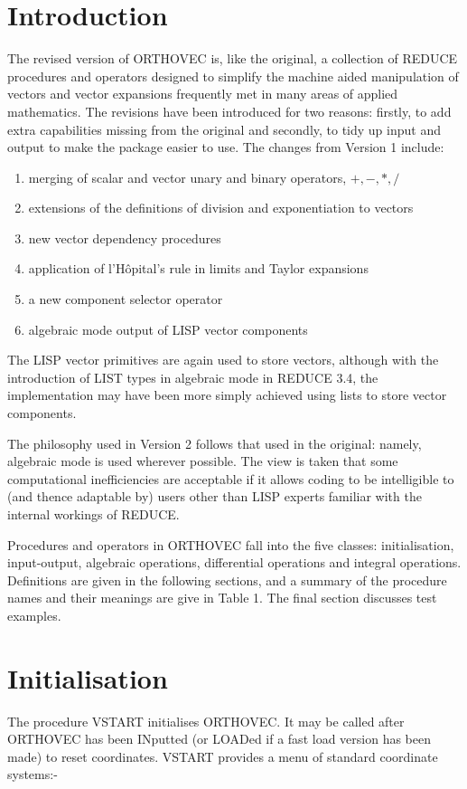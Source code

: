 \section{Introduction}
The revised version of ORTHOVEC\cite{Eastwood:91} is, like the
original\cite{Eastwood:87}, a collection of REDUCE procedures and
operators designed to simplify the machine aided manipulation of vectors
and vector expansions frequently met in many areas of applied mathematics.
The revisions have been introduced for two reasons: firstly, to add extra
capabilities missing from the original and secondly, to tidy up input and
output to make the package easier to use.
\newpage
The changes from Version 1 include:

\begin{enumerate}
\item merging of scalar and vector unary and binary operators, $+, - , *, /
$
\item extensions of the definitions of division and exponentiation 
to vectors
\item new vector dependency procedures
\item application of l'H\^opital's rule in limits and Taylor expansions
\item a new component selector operator
\item algebraic mode output of LISP vector components
\end{enumerate}

The LISP vector primitives are again used to store vectors, although 
with the introduction of LIST types in algebraic mode in REDUCE
3.4, the implementation may have been more simply achieved 
using lists to store vector components.

The philosophy used in Version 2 follows that used in the original:
namely, algebraic mode is used wherever possible.  The view is taken
that some computational inefficiencies are acceptable if it allows
coding to be intelligible to (and thence adaptable by) users other
than LISP experts familiar with the internal workings of REDUCE.

Procedures and operators in ORTHOVEC fall into the five classes: 
initialisation, input-output, algebraic operations, differential
operations and integral operations.  Definitions are given in 
the following sections, and
a summary of the procedure names and their meanings are give in Table 1.
The final section discusses test examples.

\section{Initialisation}\label{vstart}
The procedure VSTART initialises ORTHOVEC.  It may be
called after ORTHOVEC has been INputted (or LOADed if a fast load
version has been made) to reset coordinates.  VSTART provides a
menu of standard coordinate systems:-


